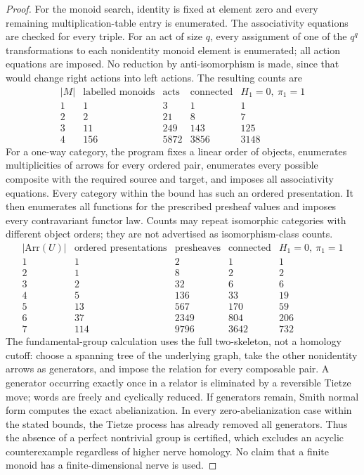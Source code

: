 \documentclass[11pt,a4paper]{article}
\theoremstyle{definition}
\theoremstyle{remark}
\begin{document}
\begin{proof}
For the monoid search, identity is fixed at element zero and every remaining multiplication-table entry is enumerated. The associativity equations are checked for every triple. For an act of size $q$, every assignment of one of the $q^q$ transformations to each nonidentity monoid element is enumerated; all action equations are imposed. No reduction by anti-isomorphism is made, since that would change right actions into left actions. The resulting counts are
\[
\begin{array}{r|r|r|r|r}
 |M|&\text{labelled monoids}&\text{acts}&\text{connected}&H_1=0,\ \pi_1=1\\\hline
 1&1&3&1&1\\
 2&2&21&8&7\\
 3&11&249&143&125\\
 4&156&5872&3856&3148
\end{array}
\]
For a one-way category, the program fixes a linear order of objects, enumerates multiplicities of arrows for every ordered pair, enumerates every possible composite with the required source and target, and imposes all associativity equations. Every category within the bound has such an ordered presentation. It then enumerates all functions for the prescribed presheaf values and imposes every contravariant functor law. Counts may repeat isomorphic categories with different object orders; they are not advertised as isomorphism-class counts.
\[
\begin{array}{r|r|r|r|r}
 |\mathrm{Arr}(U)|&\text{ordered presentations}&\text{presheaves}&\text{connected}&H_1=0,\ \pi_1=1\\\hline
 1&1&2&1&1\\
 2&1&8&2&2\\
 3&2&32&6&6\\
 4&5&136&33&19\\
 5&13&567&170&59\\
 6&37&2349&804&206\\
 7&114&9796&3642&732
\end{array}
\]
The fundamental-group calculation uses the full two-skeleton, not a homology cutoff: choose a spanning tree of the underlying graph, take the other nonidentity arrows as generators, and impose the relation for every composable pair. A generator occurring exactly once in a relator is eliminated by a reversible Tietze move; words are freely and cyclically reduced. If generators remain, Smith normal form computes the exact abelianization. In every zero-abelianization case within the stated bounds, the Tietze process has already removed all generators. Thus the absence of a perfect nontrivial group is certified, which excludes an acyclic counterexample regardless of higher nerve homology. No claim that a finite monoid has a finite-dimensional nerve is used.


\end{proof}
\end{document}

